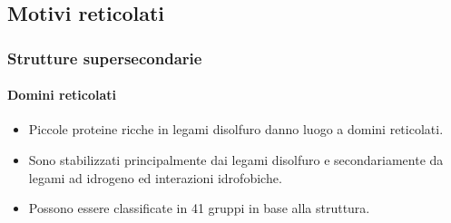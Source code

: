 \documentclass{beamer}
\begin{document}
\subsection{Motivi reticolati}
\begin{frame}
\frametitle{Strutture supersecondarie}
  \framesubtitle{Domini reticolati}
\begin{itemize}\item Piccole proteine ricche in legami disolfuro danno luogo a domini reticolati.
\pause   \item Sono stabilizzati principalmente dai legami disolfuro e secondariamente da legami ad idrogeno ed interazioni idrofobiche. 
\pause   \item Possono essere classificate in 41 gruppi in base alla struttura. \citep{disulfide}
\end{itemize}
\end{frame}




\end{document}
